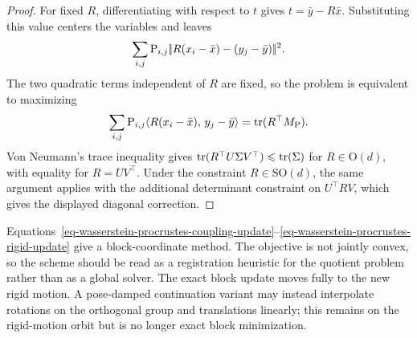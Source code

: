 \begin{proof}
	For fixed $R$, differentiating with respect to $t$ gives $t=\bar y-R\bar x$. Substituting this value centers the variables and leaves
	\[
		\sum_{i,j}\mathrm{P}_{i,j}|\!| R(x_i-\bar x)-(y_j-\bar y) |\!|^2.
	\]
	The two quadratic terms independent of $R$ are fixed, so the problem is equivalent to maximizing
	\[
		\sum_{i,j}\mathrm{P}_{i,j}\langle R(x_i-\bar x),\,y_j-\bar y\rangle
		=
		\operatorname{tr}(R^\top M_{\mathrm{P}}).
	\]
	Von Neumann's trace inequality gives $\operatorname{tr}(R^\top U\Sigma V^\top)\leqslant\operatorname{tr}(\Sigma)$ for $R\in\mathrm O(d)$, with equality for $R=UV^\top$. Under the constraint $R\in\mathrm{SO}(d)$, the same argument applies with the additional determinant constraint on $U^\top R V$, which gives the displayed diagonal correction.
	\end{proof}

	Equations~\eqref{eq-wasserstein-procrustes-coupling-update}--\eqref{eq-wasserstein-procrustes-rigid-update} give a block-coordinate method. The objective is not jointly convex, so the scheme should be read as a registration heuristic for the quotient problem rather than as a global solver. The exact block update moves fully to the new rigid motion. A pose-damped continuation variant may instead interpolate rotations on the orthogonal group and translations linearly; this remains on the rigid-motion orbit but is no longer exact block minimization.

